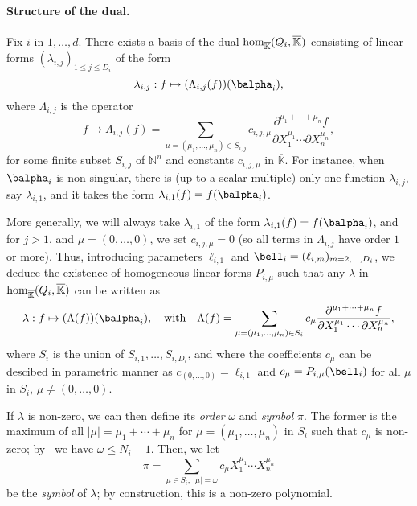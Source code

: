 \documentclass[12pt]{article}
\def\N {\ensuremath{\mathbb{N}}}
\def\Kbar {{\ensuremath{\overline{\mathbb{K}}}}}
\def\D {\ensuremath{D}}
\begin{document}
\paragraph{Structure of the dual.}
Fix $i$ in $1,\dots,d$.  There exists a basis of the dual ${\rm
  hom}_\Kbar(Q_i,\Kbar)$ consisting of linear forms
$(\lambda_{i,j})_{1\le j \le \D_i}$ of the form
$$\lambda_{i,j}: f \mapsto (\Lambda_{i,j}(f))(\balpha_i),$$
where $\Lambda_{i,j}$ is the operator
$$f \mapsto \Lambda_{i,j}(f) = \sum_{\mu=(\mu_1,\dots,\mu_n) \in
  S_{i,j}} c_{i,j,\mu} \frac{ \partial^{\mu_1 + \cdots + \mu_n} f}
{\partial X_1^{\mu_1} \cdots \partial X_n^{\mu_n}},$$ for some finite
subset $S_{i,j}$ of $\N^n$ and constants $c_{i,j,\mu}$ in
$\Kbar$. 
For instance, when $\balpha_i$ is non-singular, there is (up to a
scalar multiple) only one function $\lambda_{i,j}$, say
$\lambda_{i,1}$, and it takes the form $\lambda_{i,1}(f) =
f(\balpha_i)$. 

More generally, we will always take $\lambda_{i,1}$ of the form
$\lambda_{i,1}(f) = f(\balpha_i)$, and for $j>1$, and
$\mu=(0,\dots,0)$, we set $c_{i,j,\mu}=0$ (so all terms in
$\Lambda_{i,j}$ have order $1$ or more).  Thus, introducing 
parameters $\ell_{i,1}$ and $\bell_i=(\ell_{i,m})_{m
  =2,\dots,D_i}$, we deduce the existence of homogeneous linear forms
$P_{i,\mu}$ such that any $\lambda$ in ${\rm hom}_\Kbar(Q_i,\Kbar)$
can be written as 
$$\lambda:f \mapsto (\Lambda(f))(\balpha_i),\quad\text{with}\quad
\Lambda(f) = \sum_{\mu=(\mu_1,\dots,\mu_n) \in S_i} c_{\mu}
 \frac{ \partial^{\mu_1 + \cdots + \mu_n} f}
{\partial X_1^{\mu_1} \cdots \partial X_n^{\mu_n}},
$$ where $S_i$ is the union of $S_{i,1},\dots,S_{i,D_i}$, and where
the coefficients $c_\mu$ can be descibed in parametric manner as
$c_{(0,\dots,0)}=\ell_{i,1}$ and $c_{\mu} = P_{i,\mu}(\bell_i)$ for all
$\mu$ in $S_i$, $\mu \ne (0,\dots,0)$.

If $\lambda$ is non-zero, we can then define its {\em order} $\omega$
and {\em symbol} $\pi$. The former is the maximum of all
$|\mu|=\mu_1+\cdots+\mu_n$ for $\mu=(\mu_1,\dots,\mu_n)$ in $S_i$ 
such that $c_\mu$ is non-zero;
by~\cite[Lemma~3.3]{Mourrain97} we have $\omega \le N_i-1$. Then, we let
$$\pi =\sum_{\mu \in S_i,\ |\mu|=\omega} c_{\mu} X_1^{\mu_1} \cdots
X_n^{\mu_n}$$ be the {\em symbol} of $\lambda$; by construction,
this is a non-zero polynomial.  
\end{document}
